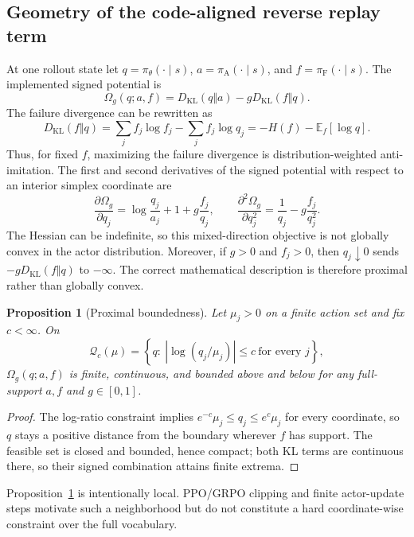 \documentclass{article}
\newcommand{\pol}{\pi_\theta}
\newcommand{\anchorpol}{\pi_{\mathrm A}}
\newcommand{\failpol}{\pi_{\mathrm F}}
\newcommand{\KL}{D_{\mathrm{KL}}}
\newcommand{\E}{\mathbb{E}}
\newtheorem{proposition}{Proposition}
\begin{document}
\subsection{Geometry of the code-aligned reverse replay term}
At one rollout state let $q=\pol(\cdot\mid s)$, $a=\anchorpol(\cdot\mid s)$, and $f=\failpol(\cdot\mid s)$. The implemented signed potential is
\begin{equation}
\Omega_g(q;a,f)=\KL(q\Vert a)-g\KL(f\Vert q).
\label{eq:local_signed_potential}
\end{equation}
The failure divergence can be rewritten as
\begin{equation}
\KL(f\Vert q)=\sum_j f_j\log f_j-\sum_jf_j\log q_j=-H(f)-\E_f[\log q].
\end{equation}
Thus, for fixed $f$, maximizing the failure divergence is distribution-weighted anti-imitation. The first and second derivatives of the signed potential with respect to an interior simplex coordinate are
\begin{equation}
\frac{\partial\Omega_g}{\partial q_j}=\log\frac{q_j}{a_j}+1+g\frac{f_j}{q_j},\qquad
\frac{\partial^2\Omega_g}{\partial q_j^2}=\frac{1}{q_j}-g\frac{f_j}{q_j^2}.
\end{equation}
The Hessian can be indefinite, so this mixed-direction objective is not globally convex in the actor distribution. Moreover, if $g>0$ and $f_j>0$, then $q_j\downarrow0$ sends $-g\KL(f\Vert q)$ to $-\infty$. The correct mathematical description is therefore proximal rather than globally convex.

\begin{proposition}[Proximal boundedness]
\label{prop:proximal_bounded_appendix}
Let $\mu_j>0$ on a finite action set and fix $c<\infty$. On
\begin{equation}
\mathcal Q_c(\mu)=\left\{q:\ |\log(q_j/\mu_j)|\le c\ \text{for every }j\right\},
\end{equation}
$\Omega_g(q;a,f)$ is finite, continuous, and bounded above and below for any full-support $a,f$ and $g\in[0,1]$.
\end{proposition}
\begin{proof}
The log-ratio constraint implies $e^{-c}\mu_j\le q_j\le e^c\mu_j$ for every coordinate, so $q$ stays a positive distance from the boundary wherever $f$ has support. The feasible set is closed and bounded, hence compact; both KL terms are continuous there, so their signed combination attains finite extrema.
\end{proof}
Proposition~\ref{prop:proximal_bounded_appendix} is intentionally local. PPO/GRPO clipping and finite actor-update steps motivate such a neighborhood but do not constitute a hard coordinate-wise constraint over the full vocabulary.
\end{document}
